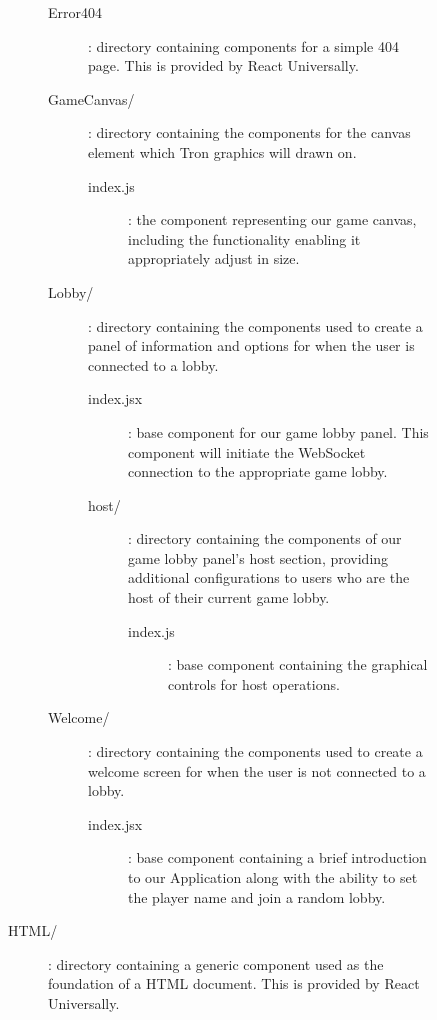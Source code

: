 \documentclass{standalone}
\begin{document}
\begin{formal}
\begin{description}
\begin{description}
\begin{description}
\begin{description}
		        			\item[Error404]: directory containing components for a simple 404 page. This is provided by React Universally.

		        			\item[GameCanvas/]: directory containing the components for the canvas element which Tron graphics will drawn on.
					      	\begin{description}
		        				\item[index.js]: the component representing our game canvas, including the functionality enabling it appropriately adjust in size.
							    \end{description}

		        			\item[Lobby/]: directory containing the components used to create a panel of information and options for when the user is connected to a lobby.
					      	\begin{description}
		        				\item[index.jsx]: base component for our game lobby panel. This component will initiate the WebSocket connection to the appropriate game lobby.

		        				\item[host/]: directory containing the components of our game lobby panel's host section, providing additional configurations to users who are the host of their current game lobby.
				      			\begin{description}
		        					\item[index.js]: base component containing the graphical controls for host operations.
						    		\end{description}
							    \end{description}

		        			\item[Welcome/]: directory containing the components used to create a welcome screen for when the user is not connected to a lobby.
					      	\begin{description}
		        				\item[index.jsx]: base component containing a brief introduction to our Application along with the ability to set the player name and join a random lobby.
							    \end{description}
						    \end{description}

						    \item[HTML/]: directory containing a generic component used as the foundation of a HTML document. This is provided by React Universally.
				    	\end{description}


\end{description}
\end{description}
\end{formal}
\end{document}
